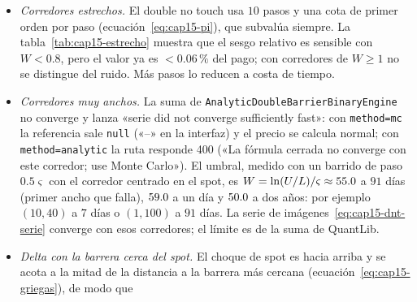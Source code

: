 \begin{limites}
\begin{itemize}
          calculado al vuelo. La tabla~\ref{tab:cap15-tabla} da la diferencia pareada con las mismas normales, en \% del pago (tabla $-$ al vuelo, $40\,000$ trayectorias).
          Con los $161$ strikes del código es de a lo más $0.03\,\%$ del pago a $91$ días, un año y dos años, del orden del ruido de la comparación pareada; con los $41$ de la
          primera versión llegaba a $-0.31\,\%$ (no touch) y $-0.51\,\%$ (double) a dos años y a $0.32\,\%$ (double) a un año. La causa es la interpolación: a dos años el paso de $0.25\varsigma$
          era $4.6\,\%$ del spot y el de $0.0625\varsigma$ es $1.1\,\%$. La Metodología declaraba «del orden de $0.3$--$0.8\,\%$ del pago» (hallazgo H24), cifra que solo valía a dos
          años con $41$ strikes; ahora declara la medida con $161$. Pasar de $41$ a $161$ strikes añade $\approx0.05$ s a un precio sin gráfica (medianas de cinco corridas: $0.96$--$1.05$ s con $41$ y $1.02$--$1.09$ s con $161$, bajo el objetivo de $1.5$ s;
          la petición completa, con gráfica, pasa de $\approx1.7$--$1.8$ s a $\approx1.9$--$2.0$ s).
    \item \emph{Corredores estrechos.} El double no touch usa $10$ pasos y una cota de primer orden por paso (ecuación~\eqref{eq:cap15-pi}), que subvalúa siempre.
          La tabla~\ref{tab:cap15-estrecho} muestra que el sesgo relativo es sensible con $W<0.8$, pero el valor ya es $<0.06\,\%$ del pago; con corredores
          de $W\ge1$ no se distingue del ruido. Más pasos lo reducen a costa de tiempo.
    \item \emph{Corredores muy anchos.} La suma de \texttt{AnalyticDoubleBarrierBinaryEngine} no converge y lanza
          «serie did not converge sufficiently fast»: con \texttt{method=mc} la referencia sale \texttt{null} («--» en la interfaz) y el precio se calcula normal; con
          \texttt{method=analytic} la ruta responde 400 («La fórmula cerrada no converge con este corredor; use Monte Carlo»). El umbral, medido con un barrido de
          paso $0.5\varsigma$ con el corredor centrado en el spot, es $W=\ln(U/L)/\varsigma\approx\verif{cap15-ancho-falla-91}{55.0}$ a $91$ días (primer ancho que
          falla), $\verif{cap15-ancho-falla-1}{59.0}$ a un día y $\verif{cap15-ancho-falla-730}{50.0}$ a dos años: por ejemplo $(10,40)$ a $7$ días o $(1,100)$ a $91$ días.
          La serie de imágenes~\eqref{eq:cap15-dnt-serie} converge con esos corredores; el límite es de la suma de QuantLib.
    \item \emph{Delta con la barrera cerca del spot.} El choque de spot es hacia arriba y se acota a la mitad de la distancia a la barrera más cercana (ecuación~\eqref{eq:cap15-griegas}), de modo que

\end{itemize}
\end{limites}
